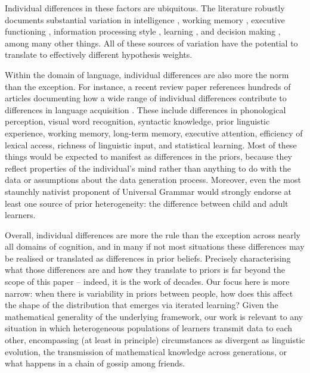 \documentclass[doc]{apa6}
\begin{document}
Individual differences in these factors are ubiquitous. The literature robustly documents substantial variation in intelligence \parencite{dearyetal00}, working memory \parencite{barrettetal04,unsworthengle07}, executive functioning \parencite{miyakefriedman12}, information processing style \parencite{humphreysrevelle84,epsteinetal96}, learning \parencite{ackerman87, greenwaldetal98}, and decision making \parencite{stanovichwest98,debruinetal07}, among many other things. All of these sources of variation have the potential to translate to effectively different hypothesis weights. 

Within the domain of language, individual differences are also more the norm than the exception. For instance, a recent review paper references hundreds of articles documenting how a wide range of individual differences contribute to differences in language acquisition \parencite{kiddetal17}. These include differences in phonological perception, visual word recognition, syntactic knowledge, prior linguistic experience, working memory, long-term memory, executive attention, efficiency of lexical access, richness of linguistic input, and statistical learning. Most of these things would be expected to manifest as differences in the priors, because they reflect properties of the individual's mind rather than anything to do with the data or assumptions about the data generation process. Moreover, even the most staunchly nativist proponent of Universal Grammar would strongly endorse at least one source of prior heterogeneity: the difference between child and adult learners. 

Overall, individual differences are more the rule than the exception across nearly all domains of cognition, and in many if not most situations these differences may be realised or translated as differences in prior beliefs. Precisely characterising what those differences are and how they translate to priors is far beyond the scope of this paper -- indeed, it is the work of decades. Our focus here is more narrow: when there is variability in priors between people, how does this affect the shape of the distribution that emerges via iterated learning? Given the mathematical generality of the underlying framework, our work is relevant to any situation in which heterogeneous populations of learners transmit data to each other, encompassing (at least in principle) circumstances as divergent as linguistic evolution, the transmission of mathematical knowledge across generations, or what happens in a chain of gossip among friends.
\end{document}
